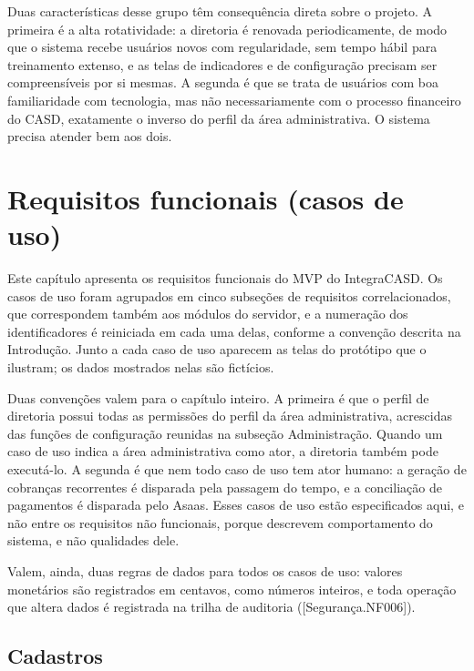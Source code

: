 \documentclass[11pt,a4paper,oneside]{report}
\begin{document}
Duas características desse grupo têm consequência direta sobre o projeto. A primeira é a alta
rotatividade: a diretoria é renovada periodicamente, de modo que o sistema recebe usuários novos
com regularidade, sem tempo hábil para treinamento extenso, e as telas de indicadores e de
configuração precisam ser compreensíveis por si mesmas. A segunda é que se trata de usuários com
boa familiaridade com tecnologia, mas não necessariamente com o processo financeiro do CASD,
exatamente o inverso do perfil da área administrativa. O sistema precisa atender bem aos dois.


\chapter{Requisitos funcionais (casos de uso)}

Este capítulo apresenta os requisitos funcionais do MVP do IntegraCASD. Os casos de uso foram
agrupados em cinco subseções de requisitos correlacionados, que correspondem também aos módulos do
servidor, e a numeração dos identificadores é reiniciada em cada uma delas, conforme a convenção
descrita na Introdução. Junto a cada caso de uso aparecem as telas do protótipo que o ilustram; os
dados mostrados nelas são fictícios.

Duas convenções valem para o capítulo inteiro. A primeira é que o perfil de diretoria possui todas
as permissões do perfil da área administrativa, acrescidas das funções de configuração reunidas na
subseção Administração. Quando um caso de uso indica a área administrativa como ator, a diretoria
também pode executá-lo. A segunda é que nem todo caso de uso tem ator humano: a geração de
cobranças recorrentes é disparada pela passagem do tempo, e a conciliação de pagamentos é disparada
pelo Asaas. Esses casos de uso estão especificados aqui, e não entre os requisitos não funcionais,
porque descrevem comportamento do sistema, e não qualidades dele.

Valem, ainda, duas regras de dados para todos os casos de uso: valores monetários são registrados
em centavos, como números inteiros, e toda operação que altera dados é registrada na trilha de
auditoria ([Segurança.NF006]).

\section{Cadastros}
\end{document}
